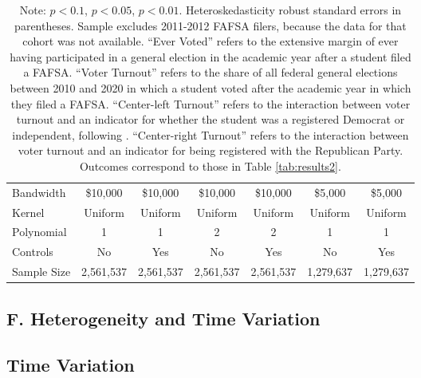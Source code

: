 \documentclass[12pt,letterpaper,oneside]{book}
\begin{document}
\begin{table}[h!]
\begin{tabular}{l*{6}{c}}
        \hline
        Bandwidth & \$10,000       &   \$10,000        &   \$10,000        &   \$10,000       &   \$5,000        &   \$5,000        \\
        Kernel&   Uniform      &   Uniform        &   Uniform        &   Uniform       &   Uniform       &   Uniform       \\
        Polynomial&   1       &   1        &   2        &   2       &   1       &   1       \\
        Controls&   No       &   Yes        &   No        &   Yes        &   No        &   Yes        \\
        Sample Size      &   2,561,537    &    2,561,537      &      2,561,537     &   2,561,537   &    1,279,637       &    1,279,637        \\
        \hline
    \end{tabular}
    \caption*{\footnotesize Note: \sym{+} \(p<0.1\), \sym{*} \(p<0.05\), \sym{**} \(p<0.01\). Heteroskedasticity robust standard errors in parentheses. Sample excludes 2011-2012 FAFSA filers, because the data for that cohort was not available. ``Ever Voted'' refers to the extensive margin of ever having participated in a general election in the academic year after a student filed a FAFSA. ``Voter Turnout'' refers to the share of all federal general elections between 2010 and 2020 in which a student voted after the academic year in which they filed a FAFSA. ``Center-left Turnout'' refers to the interaction between voter turnout and an indicator for whether the student was a registered Democrat or independent, following \cite{firoozi_effect_2023}.  ``Center-right Turnout'' refers to the interaction between voter turnout and an indicator for being registered with the Republican Party. Outcomes correspond to those in Table \ref{tab:results2}.}
\end{table}




\clearpage



\subsection*{F. Heterogeneity and Time Variation}\label{sec:ch3_heterogeneity}

\subsection{Time Variation}\label{sec:timevariation}
\end{document}
